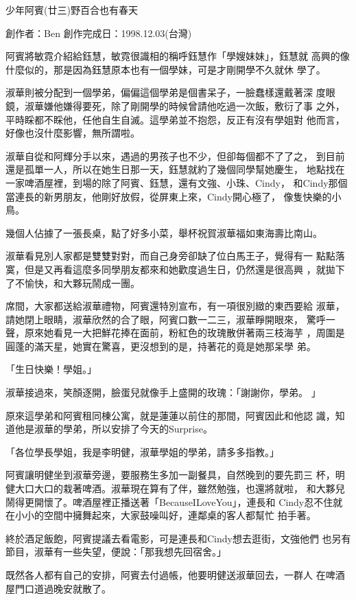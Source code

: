 



少年阿賓(廿三)野百合也有春天

創作者：Ben
創作完成日：1998.12.03(台灣)


阿賓將敏霓介紹給鈺慧，敏霓很識相的稱呼鈺慧作「學嫂妹妹」，鈺慧就
高興的像什麼似的，那是因為鈺慧原本也有一個學妹，可是才剛開學不久就休
學了。

淑華則被分配到一個學弟，偏偏這個學弟是個書呆子，一臉蠢樣還戴著深
度眼鏡，淑華嫌他嫌得要死，除了剛開學的時候曾請他吃過一次飯，敷衍了事
之外，平時睬都不睬他，任他自生自滅。這學弟並不抱怨，反正有沒有學姐對
他而言，好像也沒什麼影響，無所謂啦。

淑華自從和阿輝分手以來，遇過的男孩子也不少，但卻每個都不了了之，
到目前還是孤單一人，所以在她生日那一天，鈺慧就約了幾個同學幫她慶生，
地點找在一家啤酒屋裡，到場的除了阿賓、鈺慧，還有文強、小珠、Cindy，
和Cindy那個當連長的新男朋友，他剛好放假，從屏東上來，Cindy開心極了，
像隻快樂的小鳥。

幾個人佔據了一張長桌，點了好多小菜，舉杯祝賀淑華福如東海壽比南山。

淑華看見別人家都是雙雙對對，而自己身旁卻缺了位白馬王子，覺得有一
點點落寞，但是又再看這麼多同學朋友都來和她歡度過生日，仍然還是很高興
，就拋下了不愉快，和大夥玩鬧成一團。

席間，大家都送給淑華禮物，阿賓還特別宣布，有一項很別緻的東西要給
淑華，請她閉上眼睛，淑華欣然的合了眼，阿賓口數一二三，淑華睜開眼來，
驚呼一聲，原來她看見一大把鮮花捧在面前，粉紅色的玫瑰散併著兩三枝海芋
，周圍是圓蓬的滿天星，她實在驚喜，更沒想到的是，持著花的竟是她那呆學
弟。

「生日快樂！學姐。」

淑華接過來，笑顏逐開，臉蛋兒就像手上盛開的玫瑰：「謝謝你，學弟。
」

原來這學弟和阿賓租同棟公寓，就是蓮蓮以前住的那間，阿賓因此和他認
識，知道他是淑華的學弟，所以安排了今天的Surprise。

「各位學長學姐，我是李明健，淑華學姐的學弟，請多多指教。」

阿賓讓明健坐到淑華旁邊，要服務生多加一副餐具，自然晚到的要先罰三
杯，明健大口大口的栽著啤酒。淑華現在算有了伴，雖然勉強，也還將就啦，
和大夥兒鬧得更開懷了。啤酒屋裡正播送著「BecauseILoveYou」，連長和
Cindy忍不住就在小小的空間中擁舞起來，大家鼓噪叫好，連鄰桌的客人都幫忙
拍手著。

終於酒足飯飽，阿賓提議去看電影，可是連長和Cindy想去逛街，文強他們
也另有節目，淑華有一些失望，便說：「那我想先回宿舍。」

既然各人都有自己的安排，阿賓去付過帳，他要明健送淑華回去，一群人
在啤酒屋門口道過晚安就散了。

